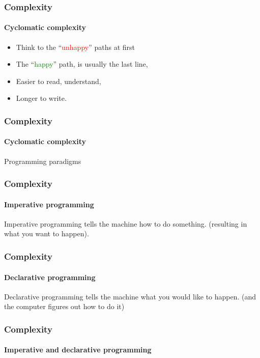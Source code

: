 \begin{frame}
    \frametitle{Complexity}
    \framesubtitle{Cyclomatic complexity}

    \begin{itemize}[<+->]
        \item Think to the ``\textcolor{red}{unhappy}'' paths at first
        \item The ``\textcolor{green}{happy}'' path, is usually the last line,
        \item Easier to read, understand,
        \item Longer to write.
    \end{itemize}
\end{frame}

\begin{frame}[fragile,c]
    \frametitle{Complexity}
    \framesubtitle{Cyclomatic complexity}
    \Huge
    Programming paradigms

\end{frame}

\begin{frame}
    \frametitle{Complexity}
    \framesubtitle{Imperative programming}

    Imperative programming tells the machine how to do something.\pause
    (resulting in what you want to happen).

\end{frame}

\begin{frame}
    \frametitle{Complexity}
    \framesubtitle{Declarative programming}

    Declarative programming tells the machine what you would like to happen.\pause
    (and the computer figures out how to do it)

\end{frame}

\begin{frame}
    \frametitle{Complexity}
    \framesubtitle{Imperative and declarative programming}


\pause


\end{frame}

